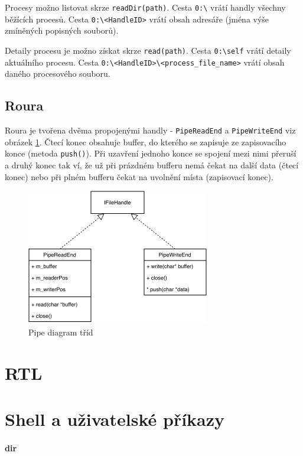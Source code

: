 \documentclass[11pt,a4paper]{scrartcl}
\begin{document}
	Procesy možno listovat skrze \verb|readDir(path)|. Cesta \verb|0:\| vrátí handly všechny běžících procesů. Cesta \verb|0:\<HandleID>| vrátí obsah adresáře (jména výše zmíněných popisných souborů).
	
	Detaily procesu je možno získat skrze \verb|read(path)|. Cesta \verb|0:\self| vrátí detaily aktuálního procesu. Cesta \verb|0:\<HandleID>\<process_file_name>| vrátí obsah daného procesového souboru.

	
	\subsection{Roura}
	
	Roura je tvořena dvěma propojenými handly - \verb|PipeReadEnd| a \verb|PipeWriteEnd| viz obrázek \ref{fig:pipe-c}. Čtecí konec obsahuje buffer, do kterého se zapisuje ze zapisovacího konce (metoda \verb|push()|). Při uzavření jednoho konce se spojení mezi nimi přeruší a druhý konec tak ví, že už při prázdném bufferu nemá čekat na další data (čtecí konec) nebo při plném bufferu čekat na uvolnění místa (zapisovací konec).
	
	\begin{figure}[H]
		\centering
		\includegraphics[width=8cm]{pipe-c.pdf}
		\caption{Pipe diagram tříd}
		\label{fig:pipe-c}
	\end{figure}
	
	\section{RTL}
	
	\section{Shell a uživatelské příkazy}
	
	\paragraph{dir}
	
\end{document}
